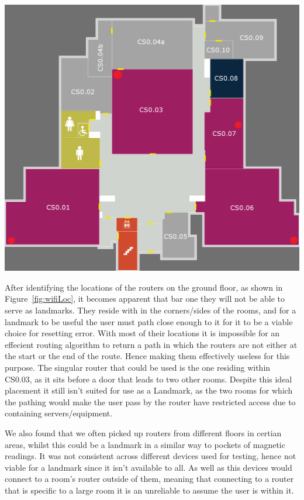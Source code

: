\documentclass[main.tex]{subfiles}
\begin{document}
\begin{center}
\includegraphics[scale=0.3]{images-implementation/wifiLocation.png}
\label{fig:wifiLoc}
\end{center}

After identifying the locations of the routers on the ground floor, as shown in Figure~\ref{fig:wifiLoc}, it becomes apparent that bar one they will not be able to serve as landmarks. They reside with in the corners/sides of the rooms, and for a landmark to be useful the user must path close enough to it for it to be a viable choice for resetting error. With most of their locations it is impossible for an effecient routing algorithm to return a path in which the routers are not either at the start or the end of the route. Hence making them effectively useless for this purpose. The singular router that could be used is the one residing within CS0.03, as it sits before a door that leads to two other rooms. Despite this ideal placement it still isn't suited for use as a Landmark, as the two rooms for which the pathing would make the user pass by the router have restricted access due to containing servers/equipment.

We also found that we often picked up routers from different floors in certian areas, whilst this could be a landmark in a similar way to pockets of magnetic readings. It was not consistent across different devices used for testing, hence not viable for a landmark since it isn't available to all. As well as this devices would connect to a room's router outside of them, meaning that connecting to a router that is specific to a large room it is an unreliable to assume the user is within it.
\end{document}
